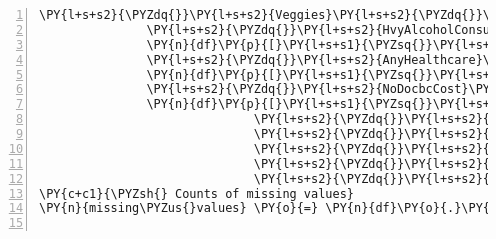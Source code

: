 \documentclass[12pt]{article}
\begin{document}
\begin{Verbatim}[commandchars=\\\{\},numbers=left,firstnumber=1,stepnumber=1,formatcom=\footnotesize]
                              \PY{l+s+s2}{\PYZdq{}}\PY{l+s+s2}{Veggies}\PY{l+s+s2}{\PYZdq{}}\PY{p}{:} \PY{n}{df}\PY{p}{[}\PY{l+s+s1}{\PYZsq{}}\PY{l+s+s1}{Veggies}\PY{l+s+s1}{\PYZsq{}}\PY{p}{]}\PY{o}{.}\PY{n}{value\PYZus{}counts}\PY{p}{(}\PY{p}{)}\PY{o}{.}\PY{n}{idxmax}\PY{p}{(}\PY{p}{)}\PY{p}{,}
               \PY{l+s+s2}{\PYZdq{}}\PY{l+s+s2}{HvyAlcoholConsump}\PY{l+s+s2}{\PYZdq{}}\PY{p}{:} \PYZbs{}
               \PY{n}{df}\PY{p}{[}\PY{l+s+s1}{\PYZsq{}}\PY{l+s+s1}{HvyAlcoholConsump}\PY{l+s+s1}{\PYZsq{}}\PY{p}{]}\PY{o}{.}\PY{n}{value\PYZus{}counts}\PY{p}{(}\PY{p}{)}\PY{o}{.}\PY{n}{idxmax}\PY{p}{(}\PY{p}{)}\PY{p}{,}
               \PY{l+s+s2}{\PYZdq{}}\PY{l+s+s2}{AnyHealthcare}\PY{l+s+s2}{\PYZdq{}}\PY{p}{:} \PYZbs{}
               \PY{n}{df}\PY{p}{[}\PY{l+s+s1}{\PYZsq{}}\PY{l+s+s1}{AnyHealthcare}\PY{l+s+s1}{\PYZsq{}}\PY{p}{]}\PY{o}{.}\PY{n}{value\PYZus{}counts}\PY{p}{(}\PY{p}{)}\PY{o}{.}\PY{n}{idxmax}\PY{p}{(}\PY{p}{)}\PY{p}{,}
               \PY{l+s+s2}{\PYZdq{}}\PY{l+s+s2}{NoDocbcCost}\PY{l+s+s2}{\PYZdq{}}\PY{p}{:} \PYZbs{}
               \PY{n}{df}\PY{p}{[}\PY{l+s+s1}{\PYZsq{}}\PY{l+s+s1}{NoDocbcCost}\PY{l+s+s1}{\PYZsq{}}\PY{p}{]}\PY{o}{.}\PY{n}{value\PYZus{}counts}\PY{p}{(}\PY{p}{)}\PY{o}{.}\PY{n}{idxmax}\PY{p}{(}\PY{p}{)}\PY{p}{,}
                              \PY{l+s+s2}{\PYZdq{}}\PY{l+s+s2}{GenHlth}\PY{l+s+s2}{\PYZdq{}}\PY{p}{:} \PY{n}{df}\PY{p}{[}\PY{l+s+s1}{\PYZsq{}}\PY{l+s+s1}{GenHlth}\PY{l+s+s1}{\PYZsq{}}\PY{p}{]}\PY{o}{.}\PY{n}{value\PYZus{}counts}\PY{p}{(}\PY{p}{)}\PY{o}{.}\PY{n}{idxmax}\PY{p}{(}\PY{p}{)}\PY{p}{,}
                              \PY{l+s+s2}{\PYZdq{}}\PY{l+s+s2}{DiffWalk}\PY{l+s+s2}{\PYZdq{}}\PY{p}{:} \PY{n}{df}\PY{p}{[}\PY{l+s+s1}{\PYZsq{}}\PY{l+s+s1}{DiffWalk}\PY{l+s+s1}{\PYZsq{}}\PY{p}{]}\PY{o}{.}\PY{n}{value\PYZus{}counts}\PY{p}{(}\PY{p}{)}\PY{o}{.}\PY{n}{idxmax}\PY{p}{(}\PY{p}{)}\PY{p}{,}
                              \PY{l+s+s2}{\PYZdq{}}\PY{l+s+s2}{Sex}\PY{l+s+s2}{\PYZdq{}}\PY{p}{:} \PY{n}{df}\PY{p}{[}\PY{l+s+s1}{\PYZsq{}}\PY{l+s+s1}{Sex}\PY{l+s+s1}{\PYZsq{}}\PY{p}{]}\PY{o}{.}\PY{n}{value\PYZus{}counts}\PY{p}{(}\PY{p}{)}\PY{o}{.}\PY{n}{idxmax}\PY{p}{(}\PY{p}{)}\PY{p}{,}
                              \PY{l+s+s2}{\PYZdq{}}\PY{l+s+s2}{Education}\PY{l+s+s2}{\PYZdq{}}\PY{p}{:} \PY{n}{df}\PY{p}{[}\PY{l+s+s1}{\PYZsq{}}\PY{l+s+s1}{Education}\PY{l+s+s1}{\PYZsq{}}\PY{p}{]}\PY{o}{.}\PY{n}{value\PYZus{}counts}\PY{p}{(}\PY{p}{)}\PY{o}{.}\PY{n}{idxmax}\PY{p}{(}\PY{p}{)}\PY{p}{,}
                              \PY{l+s+s2}{\PYZdq{}}\PY{l+s+s2}{Income}\PY{l+s+s2}{\PYZdq{}}\PY{p}{:} \PY{n}{df}\PY{p}{[}\PY{l+s+s1}{\PYZsq{}}\PY{l+s+s1}{Income}\PY{l+s+s1}{\PYZsq{}}\PY{p}{]}\PY{o}{.}\PY{n}{value\PYZus{}counts}\PY{p}{(}\PY{p}{)}\PY{o}{.}\PY{n}{idxmax}\PY{p}{(}\PY{p}{)}\PY{p}{\PYZcb{}}
\PY{c+c1}{\PYZsh{} Counts of missing values}
\PY{n}{missing\PYZus{}values} \PY{o}{=} \PY{n}{df}\PY{o}{.}\PY{n}{isnull}\PY{p}{(}\PY{p}{)}\PY{o}{.}\PY{n}{sum}\PY{p}{(}\PY{p}{)}


\end{Verbatim}
\end{document}
